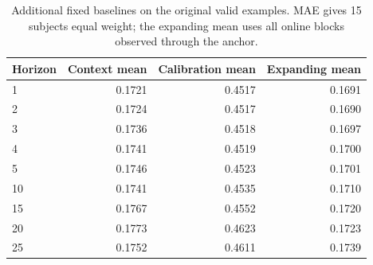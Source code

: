 \begin{table}[!ht]
\centering\small
\setlength{\tabcolsep}{5pt}
\caption{Additional fixed baselines on the original valid examples. MAE gives 15 subjects equal weight; the expanding mean uses all online blocks observed through the anchor.}
\label{tab:supp_additional_baselines}
\begin{tabular}{lrrr}
\toprule
Horizon & Context mean & Calibration mean & Expanding mean \\
\midrule
1 & 0.1721 & 0.4517 & 0.1691 \\
2 & 0.1724 & 0.4517 & 0.1690 \\
3 & 0.1736 & 0.4518 & 0.1697 \\
4 & 0.1741 & 0.4519 & 0.1700 \\
5 & 0.1746 & 0.4523 & 0.1701 \\
10 & 0.1741 & 0.4535 & 0.1710 \\
15 & 0.1767 & 0.4552 & 0.1720 \\
20 & 0.1773 & 0.4623 & 0.1723 \\
25 & 0.1752 & 0.4611 & 0.1739 \\
\bottomrule\end{tabular}\end{table}

